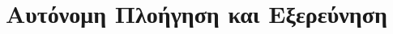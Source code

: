 \documentclass[10pt, compress]{beamer}
\begin{document}
\section{Αυτόνομη Πλοήγηση και Εξερεύνηση}

\end{document}
